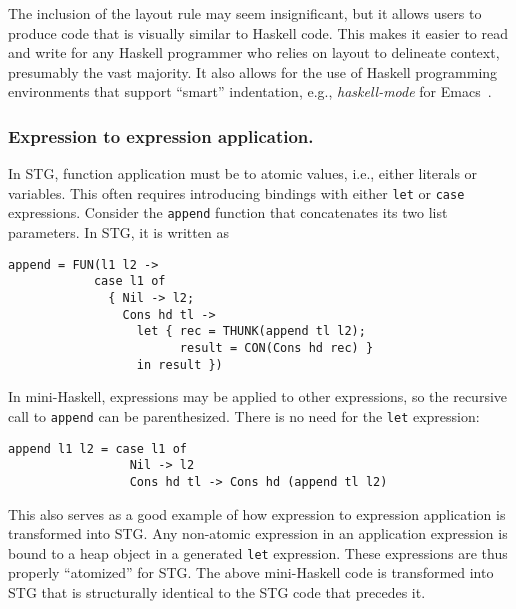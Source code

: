 \documentclass{llncs}
\begin{document}
The inclusion of the layout rule may seem insignificant, but it
allows users to produce code that is visually similar to Haskell code.
This makes it easier to read and write for any Haskell programmer who relies
on layout to delineate context, presumably the vast majority.  It also allows
for the use of Haskell programming environments that support ``smart''
indentation, e.g., \emph{haskell-mode} for Emacs~\cite{haskellmode}.





\subsubsection{Expression to expression application.}

In STG, function application must be to atomic values, i.e., either literals or
variables.  This often requires introducing bindings with either \texttt{let} or
\texttt{case} expressions.  Consider the \texttt{append} function that
concatenates its two list parameters.  In STG, it is written as

\begin{verbatim}
append = FUN(l1 l2 ->
            case l1 of
              { Nil -> l2;
                Cons hd tl -> 
                  let { rec = THUNK(append tl l2);
                        result = CON(Cons hd rec) }
                  in result })
\end{verbatim}
In mini-Haskell, expressions may be applied to other expressions, so the
recursive call to \texttt{append} can be parenthesized. There is no need for the
\texttt{let} expression:
\begin{verbatim}
append l1 l2 = case l1 of
                 Nil -> l2
                 Cons hd tl -> Cons hd (append tl l2)
\end{verbatim}
This also serves as a good example of how expression to expression application is
transformed into STG.  Any non-atomic expression in an application expression is
bound to a heap object in a generated \texttt{let} expression.  These
expressions are thus properly ``atomized'' for STG.  The above mini-Haskell code
is transformed into STG that is structurally identical to the STG code that
precedes it.
\end{document}
